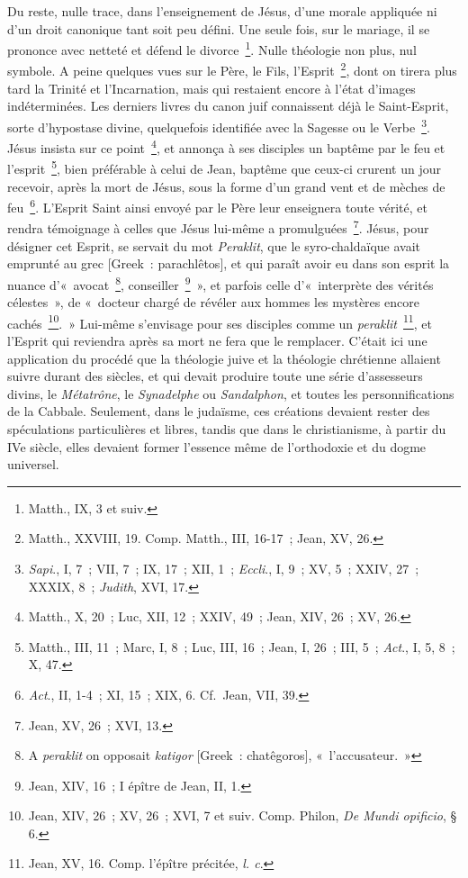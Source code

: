 \documentclass[french,twoside]{book} %
\begin{document}
Du reste, nulle trace, dans l’enseignement de Jésus, d’une morale appliquée ni d’un droit canonique tant soit peu défini. Une seule fois, sur le mariage, il se prononce avec netteté et défend le divorce \footnote{Matth., IX, 3 et suiv.}. Nulle théologie non plus, nul symbole. A peine quelques vues sur le Père, le Fils, l’Esprit \footnote{ Matth., XXVIII, 19. Comp. Matth., III, 16-17 ; Jean, XV, 26.}, dont on tirera plus tard la Trinité et l’Incarnation, mais qui restaient encore à l’état d’images indéterminées. Les derniers livres du canon juif connaissent déjà le Saint-Esprit, sorte d’hypostase divine, quelquefois identifiée avec la Sagesse ou le Verbe \footnote{{\itshape Sapi}., I, 7 ; VII, 7 ; IX, 17 ; XII, 1 ; {\itshape Eccli}., I, 9 ; XV, 5 ; XXIV, 27 ; XXXIX, 8 ; {\itshape Judith}, XVI, 17.}. Jésus insista sur ce point \footnote{Matth., X, 20 ; Luc, XII, 12 ; XXIV, 49 ; Jean, XIV, 26 ; XV, 26.}, et annonça à ses disciples un baptême par le feu et l’esprit \footnote{ Matth., III, 11 ; Marc, I, 8 ; Luc, III, 16 ; Jean, I, 26 ; III, 5 ; {\itshape Act}., I, 5, 8 ; X, 47.}, bien préférable à celui de Jean, baptême que ceux-ci crurent un jour recevoir, après la mort de Jésus, sous la forme d’un grand vent et de mèches de feu \footnote{{\itshape Act}., II, 1-4 ; XI, 15 ; XIX, 6. Cf. Jean, VII, 39.}. L’Esprit Saint ainsi envoyé par le Père leur enseignera toute vérité, et rendra témoignage à celles que Jésus lui-même a promulguées \footnote{Jean, XV, 26 ; XVI, 13.}. Jésus, pour désigner cet Esprit, se servait du mot {\itshape Peraklit}, que le syro-chaldaïque avait emprunté au grec [Greek : parachlêtos], et qui paraît avoir eu dans son esprit la nuance d’« avocat \footnote{ A {\itshape peraklit} on opposait {\itshape katigor} [Greek : chatêgoros], « l’accusateur. »}, conseiller \footnote{Jean, XIV, 16 ; I épître de Jean, II, 1.} », et parfois celle d’« interprète des vérités célestes », de « docteur chargé de révéler aux hommes les mystères encore cachés \footnote{ Jean, XIV, 26 ; XV, 26 ; XVI, 7 et suiv. Comp. Philon, {\itshape De Mundi opificio}, § 6.}. » Lui-même s’envisage pour ses disciples comme un {\itshape peraklit} \footnote{ Jean, XV, 16. Comp. l’épître précitée, {\itshape l. c}.}, et l’Esprit qui reviendra après sa mort ne fera que le remplacer. C’était ici une application du procédé que la théologie juive et la théologie chrétienne allaient suivre durant des siècles, et qui devait produire toute une série d’assesseurs divins, le {\itshape Métatrône}, le {\itshape Synadelphe} ou {\itshape Sandalphon}, et toutes les personnifications de la Cabbale. Seulement, dans le judaïsme, ces créations devaient rester des spéculations particulières et libres, tandis que dans le christianisme, à partir du IVe siècle, elles devaient former l’essence même de l’orthodoxie et du dogme universel.\par
\end{document}
